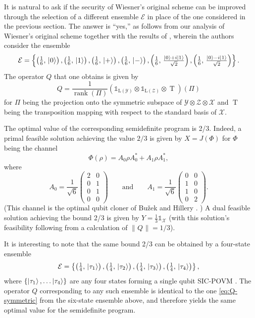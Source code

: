 \documentclass[11pt,letterpaper]{article}
\theoremstyle{definition}
\newcommand{\tinyspace}{\mspace{1mu}}
\newcommand{\microspace}{\mspace{0.5mu}}
\newcommand{\op}[1]{\operatorname{#1}}
\newcommand{\norm}[1]{\left\lVert\tinyspace#1\tinyspace\right\rVert}
\def\I{\mathbb{1}}
\newcommand{\setft}[1]{\mathrm{#1}}
\newcommand{\lin}[1]{\setft{L}\left(#1\right)}
\def \lket {\left|}
\def \rket {\right\rangle}
\newcommand{\ket}[1]{\lket\microspace #1 \microspace\rket}
\def\X{\mathcal{X}}
\def\Y{\mathcal{Y}}
\def\Z{\mathcal{Z}}
\def\E{\mathcal{E}}
\begin{document}
It is natural to ask if the security of Wiesner's original scheme can
be improved through the selection of a different ensemble $\E$ in
place of the one considered in the previous section.
The answer is ``yes,'' as follows from our analysis of Wiesner's
original scheme together with the results of \cite{PYJLC11}, wherein
the authors consider the ensemble 
\[
\textstyle
\E = 
\left\{
\left(\frac{1}{6}, \, \ket{0}\right),
\left(\frac{1}{6}, \, \ket{1}\right),
\left(\frac{1}{6}, \, \ket{+}\right),
\left(\frac{1}{6}, \, \ket{-}\right),
\left(\frac{1}{6}, \, \frac{\ket{0} + i\ket{1}}{\sqrt{2}}\right),
\left(\frac{1}{6}, \, \frac{\ket{0} - i\ket{1}}{\sqrt{2}}\right)
\right\}.
\]
The operator $Q$ that one obtains is given by
\begin{equation} \label{eq:Q-symmetric}
  Q = \frac{1}{\op{rank}(\Pi)}
  \left(\I_{\lin{\Y}}\otimes\I_{\lin{\Z}}\otimes\op{T}\right)(\Pi)
\end{equation}
for $\Pi$ being the projection onto the symmetric subspace of
$\Y\otimes\Z\otimes\X$ and $\op{T}$ being the transposition
mapping with respect to the standard basis of $\X$.

The optimal value of the corresponding semidefinite program is 2/3.
Indeed, a primal feasible solution achieving the value $2/3$ is given by
$X = J(\Phi)$ for $\Phi$ being the channel
\[
\Phi(\rho) =  A_0 \rho A_0^{\ast} + A_1 \rho A_1^{\ast},
\]
where
\[
A_0 = \frac{1}{\sqrt{6}}
\begin{pmatrix}
  2 & 0 \\ 
  0 & 1 \\  
  0 & 1 \\ 
  0 & 0 
\end{pmatrix}
\qquad\text{and}\qquad
A_1 = \frac{1}{\sqrt{6}} 
\begin{pmatrix}
  0 & 0 \\ 
  1 & 0 \\  
  1 & 0 \\ 
  0 & 2 
\end{pmatrix}.
\]
(This channel is the optimal qubit cloner of Bu\v{z}ek and Hillery
\cite{BuzekH96}. )
A dual feasible solution achieving the bound 2/3 is given by
$Y = \frac{1}{3}\I_{\X}$ (with this solution's feasibility following from a
calculation of $\norm{Q} = 1/3$).

It is interesting to note that the same bound 2/3 can be obtained by a
four-state ensemble
\[
\textstyle
\E = \left\{
\left(\frac{1}{4}, \, \ket{\tau_1}\right),
\left(\frac{1}{4}, \, \ket{\tau_2}\right),
\left(\frac{1}{4}, \, \ket{\tau_3}\right),
\left(\frac{1}{4}, \, \ket{\tau_4}\right)
\right\},
\]
where $\{\ket{\tau_1},\ldots\ket{\tau_4}\}$ are any four states
forming a single qubit SIC-POVM
\cite{RenesBSC04}.
The operator $Q$ corresponding to any such ensemble is identical to the
one \eqref{eq:Q-symmetric} from the six-state ensemble above, and
therefore yields the same optimal value for the semidefinite program.
\end{document}
